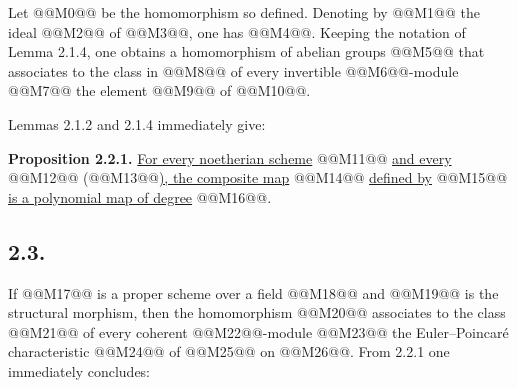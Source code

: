 
Let @@M0@@ be the homomorphism so defined. Denoting by @@M1@@ the ideal @@M2@@ of @@M3@@, one has @@M4@@. Keeping the notation of Lemma 2.1.4, one obtains a homomorphism of abelian groups
@@M5@@
that associates to the class in @@M8@@ of every invertible @@M6@@-module @@M7@@ the element @@M9@@ of @@M10@@.

Lemmas 2.1.2 and 2.1.4 immediately give:

\textbf{Proposition 2.2.1.} \uline{For every noetherian scheme} @@M11@@ \uline{and every} @@M12@@ (@@M13@@\uline{), the composite map}
@@M14@@
\uline{defined by}
@@M15@@
\uline{is a polynomial map of degree} @@M16@@.

\subsection*{2.3.}
If @@M17@@ is a proper scheme over a field @@M18@@ and @@M19@@ is the structural morphism, then the homomorphism
@@M20@@
associates to the class @@M21@@ of every coherent @@M22@@-module @@M23@@ the Euler--Poincaré characteristic @@M24@@ of @@M25@@ on @@M26@@. From 2.2.1 one immediately concludes:

